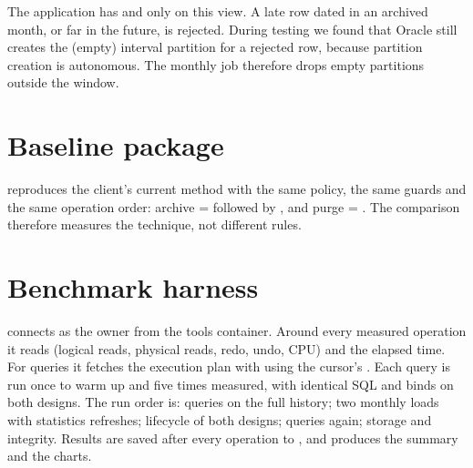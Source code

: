 The application has  and  only on this view. A late row dated in an
archived month, or far in the future, is rejected. During testing we found that Oracle still
creates the (empty) interval partition for a rejected row, because partition creation is
autonomous. The monthly job therefore drops empty partitions outside the window.

\section{Baseline package}

 reproduces the client's current method with the same policy, the same
guards and the same operation order: archive =  followed by
, and purge = . The comparison therefore measures the technique,
not different rules.

\section{Benchmark harness}

 connects as the owner from the tools container. Around every measured
operation it reads  (logical reads, physical reads, redo, undo, CPU) and the
elapsed time. For queries it fetches the execution plan with
 using the cursor's . Each query is run
once to warm up and five times measured, with identical SQL and binds on both designs. The run
order is: queries on the full history; two monthly loads with statistics refreshes; lifecycle
of both designs; queries again; storage and integrity. Results are saved after every operation
to , and  produces the summary and the
charts.
